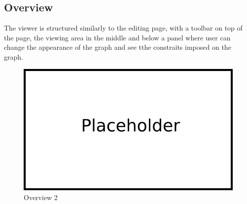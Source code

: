 \subsection{Overview}
The viewer is structured similarly to the editing page, with a toolbar on top of the page, the viewing area in the middle and below a panel where user can change the appearance of the graph and see tthe constraits imposed on the graph.
\begin{figure}[!h]
\begin{center}
\includegraphics[width=1\textwidth]{figures/Platzhalter.png}
\caption{Overview 2}
\label{img:plzhltr}
\end{center}
\end{figure}
